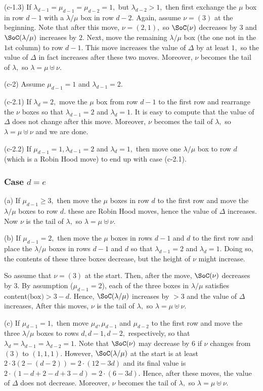 \documentclass[12pt,dvipsnames,accepted=2016-08-18,a4paper,onecolumn]{quantumarticle}
\def\la{\lambda}
\def\la{\lambda}
\numberwithin{equation}{section}
\theoremstyle{definition}
\begin{document}
(c-1.3)  If $\lambda_{d-1} = \mu_{d-1}=\mu_{d-2}=1,$ but $\la_{d-2}>1,$ then first exchange the $\mu$ box in row $d-1$ with a $\la/\mu$ box  in row $d-2.$
Again, assume $\nu =(3)$ at the beginning. Note that after this move, $\nu = (2,1),$ so $\SoC(\nu)$ decreases by $3$ and $\SoC(\la/\mu)$ increases by $2.$ 
Next, move the remaining $\la / \mu$ box (the one not in the $1$st column) to row $d-1.$ This move increases the value of $\Delta$ by at least $1,$ so the value of $\Delta$ in fact increases after these two moves. Moreover, $\nu$ becomes the tail of $\la,$ so $\lambda=\mu\uplus\nu.$


(c-2) Assume $\mu_{d-1}=1$ and $\lambda_{d-1}=2.$ 

(c-2.1) If $\lambda_d =2,$ move the $\mu$ box from row $d-1$ to the first row and rearrange the $\nu$ boxes so that $\lambda_{d-1}=2$ and $\lambda_d=1.$
It is easy to compute that the value of $\Delta$ does not change after this move.
Moreover, $\nu$ becomes the tail of $\la,$ so $\lambda=\mu\uplus\nu$ and we are done.

(c-2.2) If $\mu_{d-1}=1, \lambda_{d-1}=2$ and $\la_d=1,$ then move one $\la / \mu$ box to row $d$ (which is a Robin Hood move) to end up with case (c-2.1).


\subsubsection{Case $d=e$}
(a) If $\mu_{d-1}\geq 3,$ then move the $\mu$ boxes in row $d$ to the first row and move the $\la / \mu$ boxes to row $d.$ these are Robin Hood moves, hence the value of $\Delta$ increases. Now $\nu$ is the tail of $\la,$ so $\lambda=\mu\uplus\nu.$

(b) If $\mu_{d-1}= 2,$ then move the $\mu$ boxes in rows $d-1$ and $d$ to the first row and place the $\la / \mu$ boxes in rows $d-1$ and $d$ so that $\la_{d-1}=2$ and $\la_d=1.$ Doing so, the contents of these three boxes decrease, but the height of $\nu$ might increase. 

So assume that $\nu = (3)$ at the start. Then, after the move,
$\SoC(\nu)$ decreases by $3.$ 
 By assumption ($\mu_{d-1}=2$), each of the three boxes in $\la /\mu$ satisfies
$\text{content(box)} > 3-d$. 
Hence, $\SoC(\la/\mu)$ increases by  $>3$ and the value of $\Delta$ increases,
After this moves, $\nu$ is the tail of $\la,$ so $\lambda=\mu\uplus\nu.$


(c) If $\mu_{d-1}=1,$ then move $\mu_d,\mu_{d-1}$ and $\mu_{d-2}$ to the first row and move the three $\la/\mu$ boxes to rows $d,d-1,d-2,$ respectively, so that $\la_d = \la_{d-1} = \la_{d-2}=1.$ Note that $\SoC(\nu)$ may decrease by $ 6$ if $\nu$ changes from $(3)$ to $(1,1,1).$ However, $\SoC(\la/\mu)$ at the start is at least
$
2 \cdot 3(2-(d-2)) = 2 \cdot (12-3d)
$
and its final value is 
$
2\cdot(1-d+2-d+3-d) = 2\cdot (6-3d).
$
Hence, after these moves, the value of $\Delta$ does not decrease.
Moreover, $\nu$ becomes the tail of $\la,$ so $\lambda=\mu\uplus\nu.$
\end{document}
